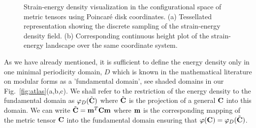 \documentclass[aps,
superscriptaddress,notitlepage]{revtex4-1}
\def\phi{\varphi}
\begin{document}
\begin{figure}[ht!]
\begin{center}
\end{center}
\caption{Strain-energy density visualization in the configurational space of metric tensors using Poincaré disk coordinates. (a) Tessellated representation showing the discrete sampling of the strain-energy density field. (b) Corresponding continuous height plot of the strain-energy landscape over the same coordinate system.}
\label{fig:atlas1}
\end{figure} 
As we have already mentioned,   it is sufficient to define the energy density  only in one minimal periodicity  domain,  $D$ which is known in the mathematical literature on modular forms as a 'fundamental domain', see shaded domains in our Fig.~\ref{fig:atlas}(a,b,c). We shall refer to the restriction of the energy density to the fundamental domain   as $\phi_D(\tilde{\bf C})$ where $\tilde{\bf C}$ is the projection of  a  general ${\bf C}$ into this domain. We can write $\tilde{\bf C}={\bf m}^T{\bf C} {\bf m}$  where   ${\bf m}$ is the  corresponding  mapping  of the metric tensor ${\bf C}$ into  the fundamental   domain ensuring that  $ \phi({\bf C})= \phi_D(\tilde{\bf C})$.  
\end{document}

